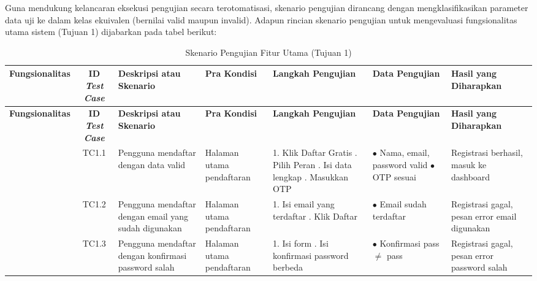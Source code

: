 Guna mendukung kelancaran eksekusi pengujian secara terotomatisasi, skenario pengujian dirancang dengan mengklasifikasikan parameter data uji ke dalam kelas ekuivalen (bernilai valid maupun invalid). Adapun rincian skenario pengujian untuk mengevaluasi fungsionalitas utama sistem (Tujuan 1) dijabarkan pada tabel berikut:

\clearpage
\pagestyle{lscape}
\begin{landscape}
\begin{xltabular}{\linewidth}{|c|c|L|L|L|L|L|}
\caption{Skenario Pengujian Fitur Utama (Tujuan 1)}
\label{tab:skenario-tujuan1} \\
\hline
{}
\centering\textbf{Fungsio\-nalitas} & \centering\textbf{ID \textit{Test Case}} & \centering\textbf{Deskripsi atau \newline Skenario} & \centering\textbf{Pra Kondisi} & \centering\textbf{Langkah Pengujian} & \centering\textbf{Data Pengujian} & \centering\arraybackslash\textbf{Hasil yang Diharapkan} \\ \hline
\endfirsthead

\hline
{}
\centering\textbf{Fungsio\-nalitas} & \centering\textbf{ID \textit{Test Case}} & \centering\textbf{Deskripsi atau \newline Skenario} & \centering\textbf{Pra Kondisi} & \centering\textbf{Langkah Pengujian} & \centering\textbf{Data Pengujian} & \centering\arraybackslash\textbf{Hasil yang Diharapkan} \\ \hline
\endhead

\hline
\endfoot

\hline
\endlastfoot

& TC1.1 & Pengguna mendaftar dengan data valid & Halaman utama pendaftaran & 1. Klik Daftar Gratis . Pilih Peran . Isi data lengkap . Masukkan OTP & $\bullet$ Nama, email, password valid \newline $\bullet$ OTP sesuai & Registrasi berhasil, masuk ke dashboard \\ 
& TC1.2 & Pengguna mendaftar dengan email yang sudah digunakan & Halaman utama pendaftaran & 1. Isi email yang terdaftar . Klik Daftar & $\bullet$ Email sudah terdaftar & Registrasi gagal, pesan error email digunakan \\ 
& TC1.3 & Pengguna mendaftar dengan konfirmasi password salah & Halaman utama pendaftaran & 1. Isi form . Isi konfirmasi password berbeda & $\bullet$ Konfirmasi pass $\neq$ pass & Registrasi gagal, pesan error password salah \\ \hline


\end{xltabular}
\end{landscape}
